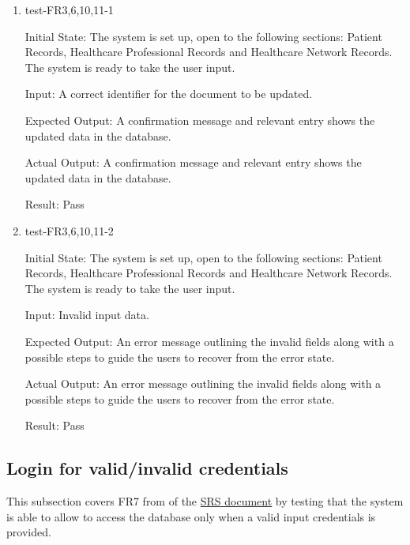 \documentclass[12pt, titlepage]{article}
\begin{document}
\begin{enumerate}

  \item{test-FR3,6,10,11-1} \label{test-FR3,6,10,11-1}
  
  Initial State: The system is set up, open to the following sections: Patient Records, Healthcare Professional Records and Healthcare Network Records. The system is ready to take the user input.

  Input: A correct identifier for the document to be updated.

  Expected Output: A confirmation message and relevant entry shows the updated data in the database.

  Actual Output: A confirmation message and relevant entry shows the updated data in the database.

  Result: Pass


  \item{test-FR3,6,10,11-2} \label{test-FR3,6,10,11-2}

  Initial State: The system is set up, open to the following sections: Patient Records, Healthcare Professional Records and Healthcare Network Records. The system is ready to take the user input.

  Input: Invalid input data.

  Expected Output: An error message outlining the invalid fields along with a possible steps to guide the users to recover from the error state.

  Actual Output: An error message outlining the invalid fields along with a possible steps to guide the users to recover from the error state.

  Result: Pass

\end{enumerate}

\subsection{Login for valid/invalid credentials} \label{section:3.4}

This subsection covers FR7 from of the \href{https://github.com/Inreet-Kaur/capstone/blob/main/docs/SRS/SRS.pdf} {SRS document} by testing that the system is able to allow to access the database only when a valid input credentials is provided.
\end{document}
